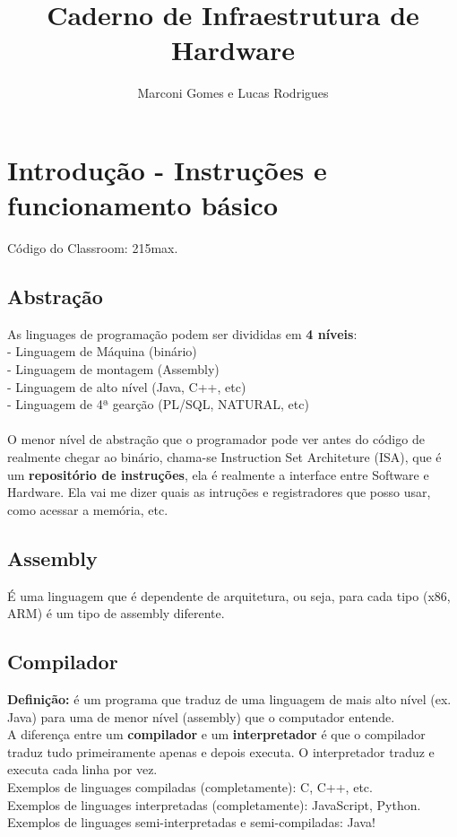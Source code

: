 \documentclass[12pt]{article}
\begin{document}
\nocite{*}

\title{Caderno de Infraestrutura de Hardware}
\author{Marconi Gomes e Lucas Rodrigues}

\maketitle


\section{Introdução - Instruções e funcionamento básico}
    Código do Classroom: 215max.
    \subsection{Abstração}
    As linguages de programação podem ser divididas em \textbf{4 níveis}:
    \\- Linguagem de Máquina (binário)
    \\- Linguagem de montagem (Assembly)
    \\- Linguagem de alto nível (Java, C++, etc)
    \\- Linguagem de 4ª gearção (PL/SQL, NATURAL, etc)
    \\~\\O menor nível de abstração que o programador pode ver antes do código de realmente chegar ao binário, chama-se Instruction Set Architeture (ISA), que é um \textbf{repositório de instruções}, ela é realmente a interface entre Software e Hardware. Ela vai me dizer quais as intruções e registradores que posso usar, como acessar a memória, etc.

    \subsection{Assembly}
    É uma linguagem que é dependente de arquitetura, ou seja, para cada tipo (x86, ARM) é um tipo de assembly diferente.

    \subsection{Compilador}
    \textbf{Definição:} é um programa que traduz de uma linguagem de mais alto nível (ex. Java) para uma de menor nível (assembly) que o computador entende.
    \\A diferença entre um \textbf{compilador} e um \textbf{interpretador} é que o compilador traduz tudo primeiramente apenas e depois executa. O interpretador traduz e executa cada linha por vez. 
    \\Exemplos de linguages compiladas (completamente): C, C++, etc.
    \\Exemplos de linguages interpretadas (completamente): JavaScript, Python.
    \\Exemplos de linguages semi-interpretadas e semi-compiladas: Java!
\end{document}
